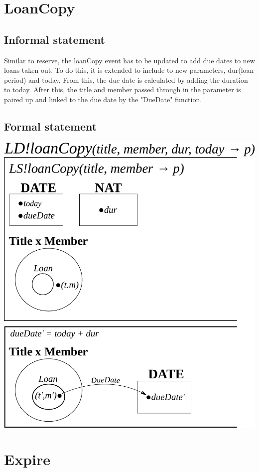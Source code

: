 \documentclass[]{article}
\begin{document}
\section{LoanCopy}
\subsection{Informal statement}
Similar to reserve, the loanCopy event has to be updated to add due dates to new loans taken out. To do this, it is extended to include to new parameters, dur(loan period) and today. From this, the due date is calculated by adding the duration to today. After this, the title and member passed through in the parameter is paired up and linked to the due date by the "DueDate" function.
\subsection{Formal statement}
\begin{center}
	\includegraphics[scale=0.75]{loan_copy.pdf}
\end{center}

\section{Expire}
\end{document}
